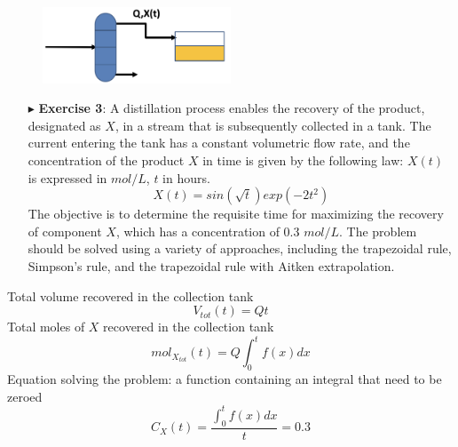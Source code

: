\documentclass[xcolor={dvipsnames,rgb}, aspectratio=169]{beamer}
\begin{document}
\begin{frame}{}
   \begin{figure}
      \centering
      \includegraphics[width=0.5\textwidth]{Schema.png}
   \end{figure}
   \begin{itemize}
      \item[$\blacktriangleright$] \textbf{Exercise 3}: \small{ A distillation process
         enables the recovery of the product, designated as $X$, in a stream that is
         subsequently collected in a tank. The current entering the tank has a constant
         volumetric flow rate, and the concentration of the product $X$ in time is given
         by the following law: $X(t)$ is expressed in $mol/L$, $t$ in hours. }
         \begin{equation*}
            X(t) = sin(\sqrt{t})exp(-2t^{2})
         \end{equation*}
         \small{ The objective is to determine the requisite time for maximizing the
         recovery of component $X$, which has a concentration of 0.3 $mol/L$. The problem
         should be solved using a variety of approaches, including the trapezoidal rule,
         Simpson's rule, and the trapezoidal rule with Aitken extrapolation.}
   \end{itemize}
\end{frame}

\begin{frame}{}
   Total volume recovered in the collection tank
   \begin{equation*}
      V_{tot}(t) = Q t 
   \end{equation*}
   Total moles of $X$ recovered in the collection tank
   \begin{equation*}
      mol_{X_{tot}}(t) = Q \int_{0}^{t}f(x)dx
   \end{equation*}
   Equation solving the problem: a function containing an integral that need to be zeroed
   \begin{equation*}
      C_{X}(t) = \frac{\int_{0}^{t}f(x)dx}{t} = 0.3
   \end{equation*}
\end{frame}
\end{document}
